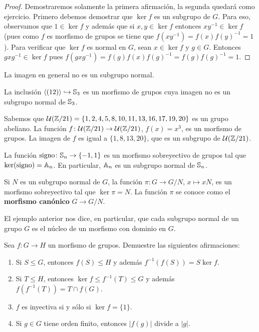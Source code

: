 \begin{proof}
	Demostraremos solamente la primera afirmación, la segunda quedará como ejercicio. Primero debemos 
	demostrar que $\ker f$ es un subgrupo de $G$. Para eso, observamos que $1\in \ker f$ y además que si $x,y\in\ker f$ entonces $xy^{-1}\in\ker f$ (pues como $f$ es morfismo de grupos se tiene 
	que $f(xy^{-1})=f(x)f(y)^{-1}=1$). Para verificar que $\ker f$ es normal en $G$, sean $x\in\ker f$ y $g\in G$. Entonces $gxg^{-1}\in\ker f$ pues
	$f(gxg^{-1})=f(g)f(x)f(g)^{-1}=f(g)f(g)^{-1}=1$.   
\end{proof}

La imagen en general no es un subgrupo normal. 

\begin{example}
La inclusión $\langle (12)\rangle\hookrightarrow\mathbb{S}_3$ es un morfismo de grupos cuya imagen  
no es un subgrupo normal de $\mathbb{S}_3$.
\end{example}

\begin{example}
Sabemos que $\mathcal{U}(\mathbb{Z}/21)=\{1,2,4,5,8,10,11,13,16,17,19,20\}$ es un grupo abeliano. La función $f\colon\mathcal{U}(\mathbb{Z}/21)\to\mathcal{U}(\mathbb{Z}/21)$, $f(x)=x^3$, es un morfismo de grupos. La imagen de $f$ es igual a $\{1,8,13,20\}$, que es un subgrupo de $\mathcal{U}(\mathbb{Z}/21)$. 
\end{example}

\begin{example}
La función $\operatorname{signo}\colon\mathbb{S}_n\to\{-1,1\}$ es un morfismo sobreyectivo de grupos tal que 
$\ker(\operatorname{signo})=\mathbb{A}_n$. En particular, $\mathbb{A}_n$ es un subgrupo normal de $\mathbb{S}_n$.   
\end{example}

\begin{example}
Si $N$ es un subgrupo normal de $G$, la función $\pi\colon G\to G/N$, $x\mapsto xN$, es un morfismo sobreyectivo tal que $\ker\pi=N$. La función $\pi$ se conoce como 
el \textbf{morfismo canónico} $G\to G/N$.
\end{example}

El ejemplo anterior nos dice, en particular, que cada subgrupo normal de un grupo $G$ es el núcleo de un morfismo con dominio en $G$. 

\begin{exercise}
Sea $f\colon G\to H$ un morfismo de grupos. Demuestre las siguientes afirmaciones:
\begin{enumerate}
\item Si $S\leq G$, entonces $f(S)\leq H$ y además $f^{-1}(f(S))=S\ker f$. 
\item Si $T\leq H$, entonces $\ker f\leq f^{-1}(T)\leq G$ y además $f(f^{-1}(T))=T\cap f(G)$. 
\item $f$ es inyectiva si y sólo si $\ker f=\{1\}$.
\item Si $g\in G$ tiene orden finito, entonces $|f(g)|$ divide a $|g|$. 
\end{enumerate}	
\end{exercise}


